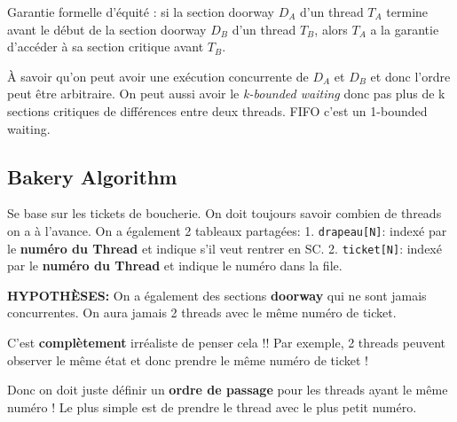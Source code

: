 Garantie formelle d'équité : si la section doorway \(D_A\) d'un thread
\(T_A\) termine avant le début de la section doorway \(D_B\) d'un thread
\(T_B\), alors \(T_A\) a la garantie d'accéder à sa section critique
avant \(T_B\).

À savoir qu'on peut avoir une exécution concurrente de \(D_A\) et
\(D_B\) et donc l'ordre peut être arbitraire. On peut aussi avoir le
\emph{k-bounded waiting} donc pas plus de k sections critiques de
différences entre deux threads. FIFO c'est un 1-bounded waiting.

\subsection{Bakery Algorithm}\label{bakery-algorithm}

Se base sur les tickets de boucherie. On doit toujours savoir combien de
threads on a à l'avance. On a également 2 tableaux partagées: 1.
\texttt{drapeau{[}N{]}}: indexé par le \textbf{numéro du Thread} et
indique s'il veut rentrer en SC. 2. \texttt{ticket{[}N{]}}: indexé par
le \textbf{numéro du Thread} et indique le numéro dans la file.

\textbf{HYPOTHÈSES:} On a également des sections \textbf{doorway} qui ne
sont jamais concurrentes. On aura jamais 2 threads avec le même numéro
de ticket.

C'est \textbf{complètement} irréaliste de penser cela !! Par exemple, 2
threads peuvent observer le même état et donc prendre le même numéro de
ticket !

Donc on doit juste définir un \textbf{ordre de passage} pour les threads
ayant le même numéro ! Le plus simple est de prendre le thread avec le
plus petit numéro.

